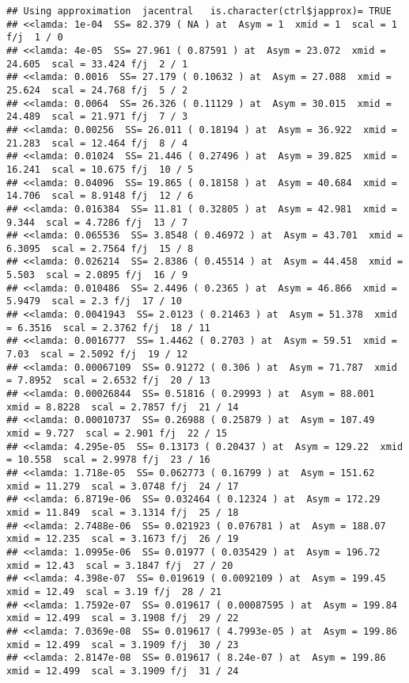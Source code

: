\documentclass[
]{article}
\begin{document}
\begin{verbatim}
## Using approximation  jacentral   is.character(ctrl$japprox)= TRUE 
## <<lamda: 1e-04  SS= 82.379 ( NA ) at  Asym = 1  xmid = 1  scal = 1 f/j  1 / 0
## <<lamda: 4e-05  SS= 27.961 ( 0.87591 ) at  Asym = 23.072  xmid = 24.605  scal = 33.424 f/j  2 / 1
## <<lamda: 0.0016  SS= 27.179 ( 0.10632 ) at  Asym = 27.088  xmid = 25.624  scal = 24.768 f/j  5 / 2
## <<lamda: 0.0064  SS= 26.326 ( 0.11129 ) at  Asym = 30.015  xmid = 24.489  scal = 21.971 f/j  7 / 3
## <<lamda: 0.00256  SS= 26.011 ( 0.18194 ) at  Asym = 36.922  xmid = 21.283  scal = 12.464 f/j  8 / 4
## <<lamda: 0.01024  SS= 21.446 ( 0.27496 ) at  Asym = 39.825  xmid = 16.241  scal = 10.675 f/j  10 / 5
## <<lamda: 0.04096  SS= 19.865 ( 0.18158 ) at  Asym = 40.684  xmid = 14.706  scal = 8.9148 f/j  12 / 6
## <<lamda: 0.016384  SS= 11.81 ( 0.32805 ) at  Asym = 42.981  xmid = 9.344  scal = 4.7286 f/j  13 / 7
## <<lamda: 0.065536  SS= 3.8548 ( 0.46972 ) at  Asym = 43.701  xmid = 6.3095  scal = 2.7564 f/j  15 / 8
## <<lamda: 0.026214  SS= 2.8386 ( 0.45514 ) at  Asym = 44.458  xmid = 5.503  scal = 2.0895 f/j  16 / 9
## <<lamda: 0.010486  SS= 2.4496 ( 0.2365 ) at  Asym = 46.866  xmid = 5.9479  scal = 2.3 f/j  17 / 10
## <<lamda: 0.0041943  SS= 2.0123 ( 0.21463 ) at  Asym = 51.378  xmid = 6.3516  scal = 2.3762 f/j  18 / 11
## <<lamda: 0.0016777  SS= 1.4462 ( 0.2703 ) at  Asym = 59.51  xmid = 7.03  scal = 2.5092 f/j  19 / 12
## <<lamda: 0.00067109  SS= 0.91272 ( 0.306 ) at  Asym = 71.787  xmid = 7.8952  scal = 2.6532 f/j  20 / 13
## <<lamda: 0.00026844  SS= 0.51816 ( 0.29993 ) at  Asym = 88.001  xmid = 8.8228  scal = 2.7857 f/j  21 / 14
## <<lamda: 0.00010737  SS= 0.26988 ( 0.25879 ) at  Asym = 107.49  xmid = 9.727  scal = 2.901 f/j  22 / 15
## <<lamda: 4.295e-05  SS= 0.13173 ( 0.20437 ) at  Asym = 129.22  xmid = 10.558  scal = 2.9978 f/j  23 / 16
## <<lamda: 1.718e-05  SS= 0.062773 ( 0.16799 ) at  Asym = 151.62  xmid = 11.279  scal = 3.0748 f/j  24 / 17
## <<lamda: 6.8719e-06  SS= 0.032464 ( 0.12324 ) at  Asym = 172.29  xmid = 11.849  scal = 3.1314 f/j  25 / 18
## <<lamda: 2.7488e-06  SS= 0.021923 ( 0.076781 ) at  Asym = 188.07  xmid = 12.235  scal = 3.1673 f/j  26 / 19
## <<lamda: 1.0995e-06  SS= 0.01977 ( 0.035429 ) at  Asym = 196.72  xmid = 12.43  scal = 3.1847 f/j  27 / 20
## <<lamda: 4.398e-07  SS= 0.019619 ( 0.0092109 ) at  Asym = 199.45  xmid = 12.49  scal = 3.19 f/j  28 / 21
## <<lamda: 1.7592e-07  SS= 0.019617 ( 0.00087595 ) at  Asym = 199.84  xmid = 12.499  scal = 3.1908 f/j  29 / 22
## <<lamda: 7.0369e-08  SS= 0.019617 ( 4.7993e-05 ) at  Asym = 199.86  xmid = 12.499  scal = 3.1909 f/j  30 / 23
## <<lamda: 2.8147e-08  SS= 0.019617 ( 8.24e-07 ) at  Asym = 199.86  xmid = 12.499  scal = 3.1909 f/j  31 / 24
\end{verbatim}
\end{document}
